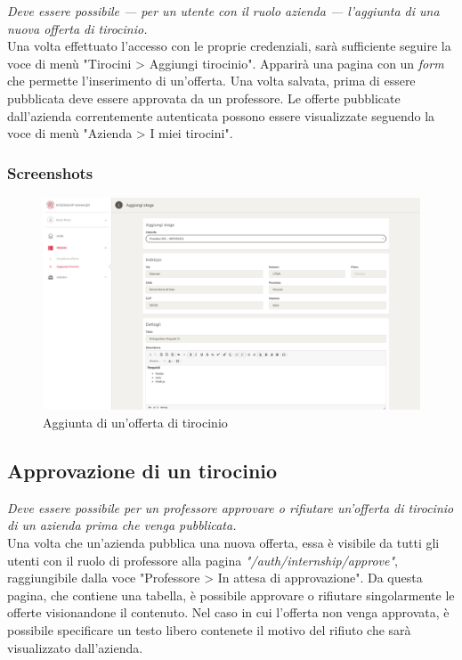 \textit{Deve essere possibile --- per un utente con il ruolo azienda --- l'aggiunta di una nuova offerta di tirocinio.} \\

\noindent
Una volta effettuato l'accesso con le proprie credenziali, sarà sufficiente seguire la voce di menù "Tirocini > Aggiungi tirocinio". Apparirà una pagina con un \textit{form} che permette l'inserimento di un'offerta. Una volta salvata, prima di essere pubblicata deve essere approvata da un professore. Le offerte pubblicate dall'azienda correntemente autenticata possono essere visualizzate seguendo la voce di menù "Azienda > I miei tirocini".

\subsubsection{Screenshots}
\begin{figure}[H]
	\centering
		\includegraphics[width=1\textwidth]{Chapter3/Figs/screenshots/addinternship}     
	\caption[Screenshot: aggiunta di un'offerta di tirocinio]{Aggiunta di un'offerta di tirocinio}
	\label{fig:screenshot:2}
\end{figure}

\pagebreak
\subsection{Approvazione di un tirocinio}\label{sec:approvazione-di-un-tirocinio}

\textit{Deve essere possibile per un professore approvare o rifiutare un'offerta di tirocinio di un azienda prima che venga pubblicata.} \\

\noindent
Una volta che un'azienda pubblica una nuova offerta, essa è visibile da tutti gli utenti con il ruolo di professore alla pagina \textit{"/auth/internship/approve"}, raggiungibile dalla voce "Professore > In attesa di approvazione". Da questa pagina, che contiene una tabella, è possibile approvare o rifiutare singolarmente le offerte visionandone il contenuto. Nel caso in cui l'offerta non venga approvata, è possibile specificare un testo libero contenete il motivo del rifiuto che sarà visualizzato dall'azienda.

